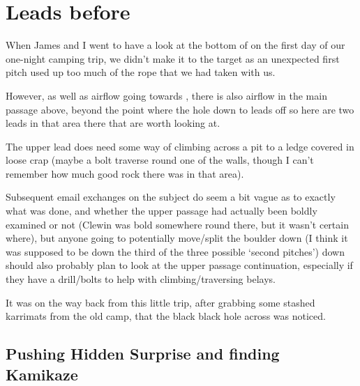 \section{Leads before }

When James and I went to have a look at the bottom of  on
the first day of our one-night camping trip, we didn't make it to the
target as an unexpected first pitch used up too much of the rope that we
had taken with us.


However, as well as airflow going towards , there is also
airflow in the main passage above, beyond the point where the hole down
to  leads off so here are two leads in that area there
that are worth looking at.

The upper lead does need some way of climbing across a pit to a
ledge covered in loose crap (maybe a bolt traverse round one of the
walls, though I can't remember how much good rock there was in that
area).

Subsequent email exchanges on the subject do seem a bit vague as to
exactly what was done, and whether the upper passage had actually been
boldly examined or not (Clewin was bold somewhere round there, but it
wasn't certain where), but anyone going to potentially move/split the
boulder down  (I think it was supposed to be down the
third of the three possible `second pitches') down should also probably
plan to look at the upper passage continuation, especially if they have
a drill/bolts to help with climbing/traversing belays.

It was on the way back from this little trip, after grabbing some stashed
karrimats from the old camp, that the black black hole across  was noticed.

\subsection{Pushing Hidden Surprise and finding Kamikaze}


